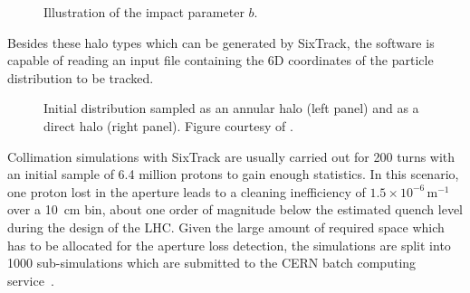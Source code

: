 \begin{figure}[t]  
  \centering
{}
  \caption{Illustration of the impact parameter $b$.}
  \label{pic:impactpar}
  \end{figure}

Besides these halo types which can be generated by SixTrack, the software is capable of reading an input file containing the 6D coordinates of the particle distribution to be tracked.




\begin{figure}[b]
  \centering
  \caption{Initial distribution sampled as an annular halo (left panel) and as a direct halo (right panel). Figure courtesy of \cite{Bruce2014a}. }  
  \label{pic:16080202}
  \end{figure}

 

Collimation simulations with SixTrack are usually carried out for 200 turns with an initial sample of 6.4 million protons to gain enough statistics. In this scenario, one proton lost in the aperture leads to a cleaning inefficiency of $1.5 \times 10^{-6} \, \text{m}^{-1}$ over a 10~cm bin, about one order of magnitude below the estimated quench level during the design of the LHC. Given the large amount of required space which has to be allocated for the aperture loss detection, the simulations are split into 1000 sub-simulations which are submitted to the CERN batch computing service~\cite{cernBatch}. 

